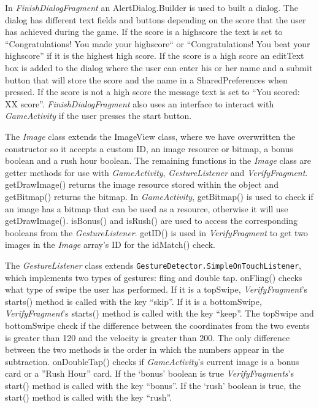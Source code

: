 In \emph{FinishDialogFragment} an AlertDialog.Builder is used to built a dialog. The dialog has different text fields and buttons depending on the score that the user has achieved during the game. If the score is a highscore the text is set to “Congratulations! You made your highscore“ or “Congratulations! You beat your highscore” if it is the highest high score. If the score is a high score an editText box is added to the dialog where the user can enter his or her name and a submit button that will store the score and the name in a SharedPreferences when pressed. If the score is not a high score the message text is set to “You scored: XX score”.
\emph{FinishDialogFragment} also uses an interface to interact with \emph{GameActivity} if the user presses the start button. \newline

The \emph{Image} class extends the ImageView class, where we have overwritten the constructor so it accepts a custom ID, an image resource or bitmap, a bonus boolean and a rush hour boolean. The remaining functions in the \emph{Image} class are getter methods for use with \emph{GameActivity}, \emph{GestureListener} and \emph{VerifyFragment}. getDrawImage() returns the image resource stored within the object and getBitmap() returns the bitmap. In \emph{GameActivity}, getBitmap() is used to check if an image has a bitmap that can be used as a resource, otherwise it will use getDrawImage(). isBonus() and isRush() are used to access the corresponding booleans from the \emph{GestureListener}. getID() is used in \emph{VerifyFragment} to get two images in the \emph{Image} array’s ID for the idMatch() check. \newline

The \emph{GestureListener} class extends \verb|GestureDetector.SimpleOnTouchListener|, \\ which implements two types of gestures: fling and double tap. onFling() checks what type of swipe the user has performed. If it is a topSwipe, \emph{VerifyFragment}'s starts() method is called with the key “skip”. If it is a bottomSwipe, \emph{VerifyFragment}'s starts() method is called with the key “keep”. The topSwipe and bottomSwipe check if the difference between the coordinates from the two events is greater than 120 and the velocity is greater than 200. The only difference between the two methods is the order in which the numbers appear in the subtraction. onDoubleTap() checks if \emph{GameActivity}’s current image is a bonus card or a ''Rush Hour'' card. If the `bonus' boolean is true \emph{VerifyFragments}'s start() method is called with the key “bonus”. If the `rush' boolean is true, the start() method is called with the key “rush”. \newline

